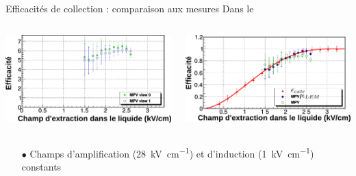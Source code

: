     \begin{frame}{Efficacités de collection : comparaison aux mesures}
        Dans le \TOO{}
        \begin{scriptsize}
            \begin{columns}
                \begin{column}{0.5\textwidth}
                    \includegraphics[width=\textwidth]{./pictures/gain_vs_extr.pdf}
                \end{column}
                \begin{column}{0.5\textwidth}
                    \includegraphics[width=\textwidth]{./pictures/comp_311_eff.pdf}
                \end{column}
            \end{columns}\vspace{0.5cm}
            \begin{columns}
                \begin{column}{0.5\textwidth}
                    \begin{itemize}
                        \item[$\bullet$] Champs d'amplification (\SI{28}{\kilo\volt\per\centi\meter}) et d'induction (\SI{1}{\kilo\volt\per\centi\meter}) constants

\end{itemize}
\end{column}
\end{columns}
\end{scriptsize}
\end{frame}
